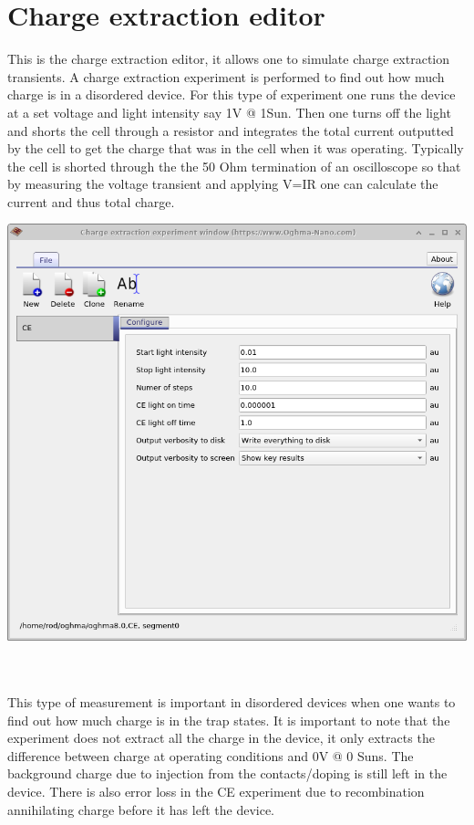 \newpage
\section{Charge extraction editor}
\noindent
\begin{minipage}{0.5\textwidth}
This is the charge extraction editor, it allows one to simulate charge extraction transients. A charge extraction experiment is performed to find out how much charge is in a disordered device. For this type of experiment one runs the device at a set voltage and light intensity say 1V @ 1Sun. Then one turns off the light and shorts the cell through a resistor and integrates the total current outputted by the cell to get the charge that was in the cell when it was operating. Typically the cell is shorted through the the 50 Ohm termination of an oscilloscope so that by measuring the voltage transient and applying V=IR one can calculate the current and thus total charge.
\end{minipage}
\hspace{4pt}
\begin{minipage}[]{0.5\linewidth}
	\centering
	\includegraphics[width=\linewidth,height=0.8\linewidth]{./images/sim_editors/ce.png}
	\label{fig:ce_editor}
\end{minipage}
\\
\\
 This type of measurement is important in disordered devices when one wants to find out how much charge is in the trap states.  It is important to note that the experiment does not extract all the charge in the device, it only extracts the difference between charge at operating conditions and 0V @ 0 Suns. The background charge due to injection from the contacts/doping is still left in the device. There is also error loss in the CE experiment due to recombination annihilating charge before it has left the device.


